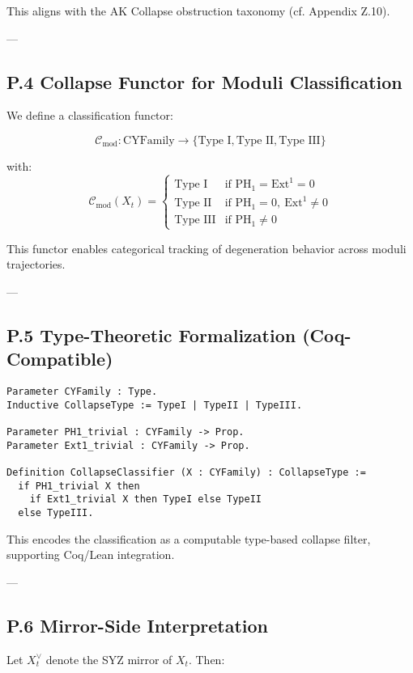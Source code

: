 \documentclass[11pt]{article}
\begin{document}
\begin{axiom}
\begin{axiom}
{{This aligns with the AK Collapse obstruction taxonomy (cf. Appendix Z.10).

---

\subsection*{P.4 Collapse Functor for Moduli Classification}

We define a classification functor:

\[
\mathcal{C}_{\text{mod}} : \mathrm{CYFamily} \to \{ \text{Type I}, \text{Type II}, \text{Type III} \}
\]

with:
\[
\mathcal{C}_{\text{mod}}(X_t) =
\begin{cases}
\text{Type I} & \text{if } \mathrm{PH}_1 = \mathrm{Ext}^1 = 0 \\
\text{Type II} & \text{if } \mathrm{PH}_1 = 0,\ \mathrm{Ext}^1 \neq 0 \\
\text{Type III} & \text{if } \mathrm{PH}_1 \neq 0
\end{cases}
\]

This functor enables categorical tracking of degeneration behavior across moduli trajectories.

---

\subsection*{P.5 Type-Theoretic Formalization (Coq-Compatible)}

\begin{lstlisting}[language=Coq]
Parameter CYFamily : Type.
Inductive CollapseType := TypeI | TypeII | TypeIII.

Parameter PH1_trivial : CYFamily -> Prop.
Parameter Ext1_trivial : CYFamily -> Prop.

Definition CollapseClassifier (X : CYFamily) : CollapseType :=
  if PH1_trivial X then
    if Ext1_trivial X then TypeI else TypeII
  else TypeIII.
\end{lstlisting}

This encodes the classification as a computable type-based collapse filter, supporting Coq/Lean integration.

---

\subsection*{P.6 Mirror-Side Interpretation}

Let \( X^\vee_t \) denote the SYZ mirror of \( X_t \). Then:

}}
\end{axiom}
\end{axiom}
\end{document}
